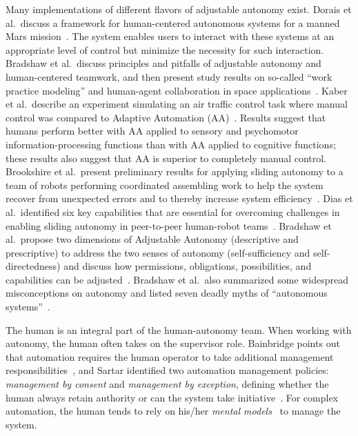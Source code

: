 \documentclass[lettersize, apacite, twoside, HRI]{apa_HRI}
\begin{document}
Many implementations of different flavors of adjustable autonomy exist. Dorais et al.\ discuss a framework for human-centered autonomous systems for a manned Mars mission~\cite{Dorais1998AdjustableAutonomy}. The system enables users to interact with these systems at an appropriate level of control but minimize the necessity for such interaction. Bradshaw et al.\ discuss principles and pitfalls of adjustable autonomy and human-centered teamwork, and then present study results on so-called ``work practice modeling'' and human-agent collaboration in space applications~\cite{Bradshaw2003AdjustableAutonomy}. Kaber et al.\ describe an experiment simulating an air traffic control task where manual control was compared to Adaptive Automation (AA)~\cite{Kaber2005Adaptive}. Results suggest that humans perform better with AA applied to sensory and psychomotor information-processing functions than with AA applied to cognitive functions; these results also suggest that AA is superior to completely manual control. Brookshire et al.\ present preliminary results for applying sliding autonomy to a team of robots performing coordinated assembling work to help the system recover from unexpected errors and to thereby increase system efficiency~\cite{Brookshire2004Preliminary}. Dias et al.\ identified six key capabilities that are essential for overcoming challenges in enabling sliding autonomy in peer-to-peer human-robot teams~\cite{Dias2008SlidingAutonomy}. Bradshaw et al.\ propose two dimensions of Adjustable Autonomy (descriptive and prescriptive) to address the two senses of autonomy (self-sufficiency and self-directedness) and discuss how permissions, obligations, possibilities, and capabilities can be adjusted~\cite{Bradshaw2004Dimensions}. Bradshaw et al.\ also summarized some widespread misconceptions on autonomy and listed seven deadly myths of ``autonomous systems''~\cite{Bradshaw2013Seven}.

The human is an integral part of the human-autonomy team. When working with autonomy, the human often takes on the supervisor role. Bainbridge points out that automation requires the human operator to take additional management responsibilities~\cite{Bainbridge1983Ironies}, and Sartar identified two automation management policies: \textit{management by consent} and \textit{management by exception}, defining whether the human always retain authority or can the system take initiative~\cite{Sarter1998Making}. For complex automation, the human tends to rely on his/her \textit{mental models}~\cite{Norman1983Some} to manage the system. 
\end{document}

